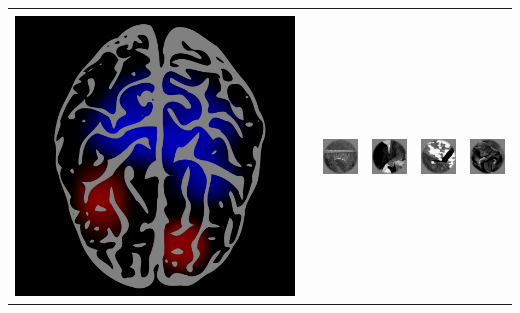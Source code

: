 \documentclass{beamer}
\newcommand{\xmark}{\textcolor{red}{\text{\sffamily X}}}
\newcommand{\cmark}{\textcolor{green}{\checkmark}}
\begin{document}
\begin{frame}
\begin{center}
\begin{tabular}{c|c|cccc}
\hline
 & & \cmark & \xmark & \xmark & \xmark \\
\includegraphics[scale = 0.035]{brain1.png} & \hspace{0.5in} 
& \includegraphics[scale = .26]{img1.png}
& \includegraphics[scale = .26]{img2.png}
& \includegraphics[scale = .26]{img3.png}
& \includegraphics[scale = .26]{img4.png}\\
\hline
\end{tabular}
\end{center}
\end{frame}
\end{document}
